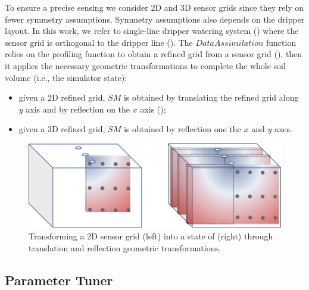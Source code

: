 To ensure a precise sensing we consider 2D and 3D sensor grids since they rely on fewer symmetry assumptions.
Symmetry assumptions also depends on the dripper layout.
In this work, we refer to single-line dripper watering system ()
where the sensor grid is orthogonal to the dripper line (). 
The $DataAssimilation$ function relies on the profiling function to obtain a refined grid from a sensor grid (), then it applies the necessary geometric transformations to complete the whole soil volume (i.e., the simulator state):  
\begin{itemize}
    \item given a 2D refined grid, $SM$ is obtained by translating the refined grid along $y$ axis and by reflection on the $x$ axis (); 
    \item given a 3D refined grid, $SM$ is obtained by reflection one the $x$ and $y$ axes.
\end{itemize}

 \begin{figure}[t]
	\centering
	\includegraphics[scale=0.7]{chapters/physics-aware/orchard/img/Simmetries.png}
	\caption{Transforming a 2D sensor grid (left) into a state of \olab{} (right) through translation and reflection geometric transformations.}
	\label{orchard-fig:simmetries}
\end{figure} 


\subsection{Parameter Tuner}

